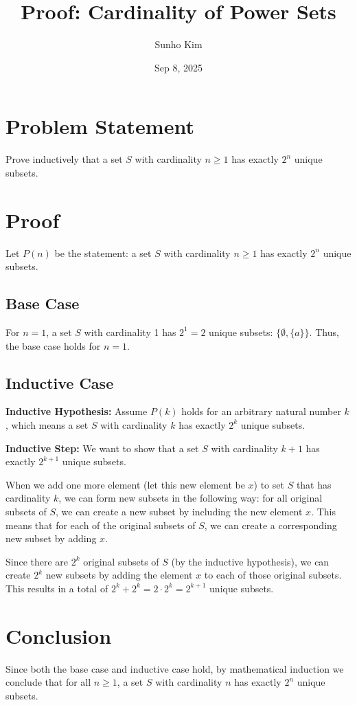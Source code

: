 \documentclass{article}
\title{Proof: Cardinality of Power Sets}
\author{Sunho Kim}
\date{Sep 8, 2025}
\begin{document}
\maketitle

\section{Problem Statement}
Prove inductively that a set $S$ with cardinality $n \geq 1$ has exactly $2^n$ unique subsets.

\section{Proof}

Let $P(n)$ be the statement: a set $S$ with cardinality $n \geq 1$ has exactly $2^n$ unique subsets.

\subsection{Base Case}
For $n = 1$, a set $S$ with cardinality 1 has $2^1 = 2$ unique subsets: $\{\emptyset, \{a\}\}$. Thus, the base case holds for $n = 1$.

\subsection{Inductive Case}
\textbf{Inductive Hypothesis:} Assume $P(k)$ holds for an arbitrary natural number $k$, which means a set $S$ with cardinality $k$ has exactly $2^k$ unique subsets.

\textbf{Inductive Step:} We want to show that a set $S$ with cardinality $k+1$ has exactly $2^{k+1}$ unique subsets.

When we add one more element (let this new element be $x$) to set $S$ that has cardinality $k$, we can form new subsets in the following way: for all original subsets of $S$, we can create a new subset by including the new element $x$. This means that for each of the original subsets of $S$, we can create a corresponding new subset by adding $x$.

Since there are $2^k$ original subsets of $S$ (by the inductive hypothesis), we can create $2^k$ new subsets by adding the element $x$ to each of those original subsets. This results in a total of $2^k + 2^k = 2 \cdot 2^k = 2^{k+1}$ unique subsets.

\section{Conclusion}
Since both the base case and inductive case hold, by mathematical induction we conclude that for all $n \geq 1$, a set $S$ with cardinality $n$ has exactly $2^n$ unique subsets.
\end{document}
